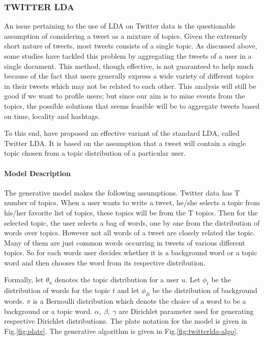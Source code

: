 
\subsubsection{\uppercase{Twitter LDA}}
An issue pertaining to the use of LDA on Twitter data is the questionable assumption of considering a tweet as a mixture of topics. Given the extremely short nature of tweets, most tweets consists of a single topic. As discussed above, some studies have tackled this problem by aggregating the tweets of a user in a single document. This method, though effective, is not guaranteed to help much because of the fact that users generally express a wide variety of different topics in their tweets which may not be related to each other. This analysis will still be good if we want to profile users; but since our aim is to mine events from the topics, the possible solutions that seems feasible will be to aggregate tweets based on time, locality and hashtags.

To this end, \cite{zhao2011comparing} have proposed an effective variant of the standard LDA, called Twitter LDA. It is based on the assumption that a tweet will contain a single topic chosen from a topic distribution of a particular user. 

\paragraph{Model Description} 
The generative model makes the following assumptions. Twitter data has T number of topics. When a user wants to write a tweet, he/she selects a topic from his/her favorite list of topics, these topics will be from the T topics. Then for the selected topic, the user selects a bag of words, one by one from the distribution of words over topics. However not all words of a tweet are closely related the topic. Many of them are just common words occurring in tweets of various different topics. So for each words user decides whether it is a background word or a topic word and then chooses the word from its respective distribution.

Formally, let $\theta_u$ denotes the topic distribution for a user $u$. Let $\phi_t$ be the distribution of words for the topic $t$ and let $\phi_B$ be the distribution of background words. $\pi$ is a Bernoulli distribution which denote the choice of a word to be a background or a topic word. $\alpha,~\beta,~\gamma$ are Dirichlet parameter used for generating respective Dirichlet distributions. The plate notation for the model is given in Fig.\ref{fig:plate}. The generative algorithm is given in Fig.\ref{fig:twitterlda-algo}.

